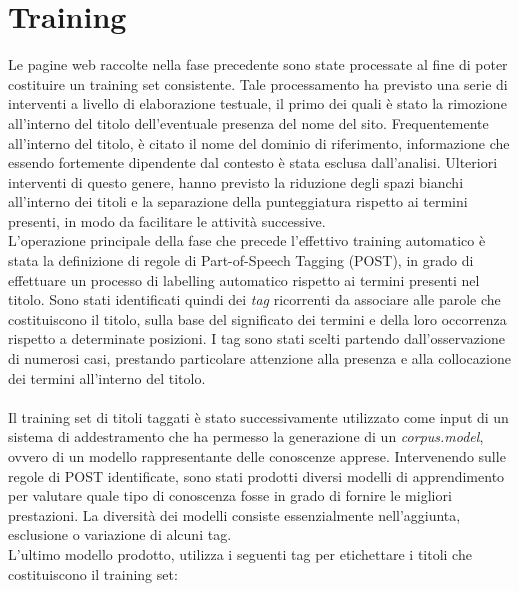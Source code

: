 \documentclass[a4paper]{report}
\begin{document}
\section{Training}
Le pagine web raccolte nella fase precedente sono state processate al fine di poter costituire un training set consistente. Tale processamento ha previsto una serie di interventi a livello di elaborazione testuale, il primo dei quali è stato la rimozione all'interno del titolo dell'eventuale presenza del nome del sito. Frequentemente all'interno del titolo, è citato il nome del dominio di riferimento, informazione che essendo fortemente dipendente dal contesto è stata esclusa dall'analisi. Ulteriori interventi di questo genere, hanno previsto la riduzione degli spazi bianchi all'interno dei titoli e la separazione della punteggiatura rispetto ai termini presenti, in modo da facilitare le attività successive. \\
L'operazione principale della fase che precede l'effettivo training automatico è stata la definizione di regole di Part-of-Speech Tagging (POST), in grado di effettuare un processo di labelling automatico rispetto ai termini presenti nel titolo. Sono stati identificati quindi dei \textit{tag} ricorrenti da associare alle parole che costituiscono il titolo, sulla base del significato dei termini e della loro occorrenza rispetto a determinate posizioni. I tag sono stati scelti partendo dall'osservazione di numerosi casi, prestando particolare attenzione alla presenza e alla collocazione dei termini all'interno del titolo. \\ \\
Il training set di titoli taggati è stato successivamente utilizzato come input di un sistema di addestramento che ha permesso la generazione di un \textit{corpus.model}, ovvero di un modello rappresentante delle conoscenze apprese. Intervenendo sulle regole di POST identificate, sono stati prodotti diversi modelli di apprendimento per valutare quale tipo di conoscenza fosse in grado di fornire le migliori prestazioni. La diversità dei modelli consiste essenzialmente nell'aggiunta, esclusione o variazione di alcuni tag. \\
L'ultimo modello prodotto, utilizza i seguenti tag per etichettare i titoli che costituiscono il training set: 
\\ \\ 
\end{document}
